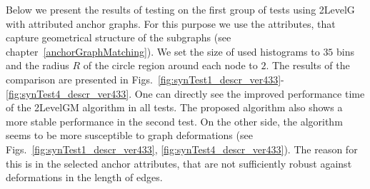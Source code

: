 Below we present the results of testing on the first group of tests using 2LevelG with attributed anchor graphs. For this purpose we use the attributes, that capture geometrical structure of the subgraphs (see chapter~\ref{anchorGraphMatching}). We set the size of used histograms to $35$ bins and the radius $R$ of the circle region around each node to $2$. The results of the comparison are presented in Figs.~\ref{fig:synTest1_descr_ver433}-\ref{fig:synTest4_descr_ver433}. One can directly see the improved performance time of the 2LevelGM algorithm in all tests. The proposed algorithm also shows a more stable performance in the second test. 
On the other side, the algorithm seems to be more susceptible to graph deformations (see Figs.~\ref{fig:synTest1_descr_ver433}, \ref{fig:synTest4_descr_ver433}). The reason for this is in the selected anchor attributes, that are not sufficiently robust against deformations in the length of edges.

